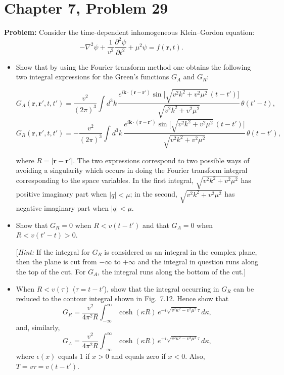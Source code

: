 \documentclass[12pt]{article}
\begin{document}
\section*{Chapter 7, Problem 29}

\textbf{Problem:} Consider the time-dependent inhomogeneous Klein--Gordon equation:
\[
-\nabla^2\psi + \frac{1}{v^2}\frac{\partial^2\psi}{\partial t^2} + \mu^2\psi = f(\mathbf{r},t).
\]

\begin{itemize}
\item[a)] Show that by using the Fourier transform method one obtains the following two integral expressions for the Green's functions $G_A$ and $G_R$:

\[
G_A(\mathbf{r},\mathbf{r}',t,t') = \frac{v^2}{(2\pi)^3}\int d^3k\,\frac{e^{i\mathbf{k}\cdot(\mathbf{r}-\mathbf{r}')}\sin\bigl[\sqrt{v^2 k^2+v^2\mu^2}\,(t-t')\bigr]}{\sqrt{v^2k^2+v^2\mu^2}}\,\theta(t'-t),
\]
\[
G_R(\mathbf{r},\mathbf{r}',t,t') = -\frac{v^2}{(2\pi)^3}\int d^3k\,\frac{e^{i\mathbf{k}\cdot(\mathbf{r}-\mathbf{r}')}\sin\bigl[\sqrt{v^2 k^2+v^2\mu^2}\,(t-t')\bigr]}{\sqrt{v^2k^2+v^2\mu^2}}\,\theta(t-t'),
\]

where $R = |\mathbf{r}-\mathbf{r}'|$. The two expressions correspond to two possible ways of avoiding a singularity which occurs in doing the Fourier transform integral corresponding to the space variables. In the first integral, $\sqrt{v^2k^2+v^2\mu^2}$ has positive imaginary part when $|q| < \mu$; in the second, $\sqrt{v^2k^2+v^2\mu^2}$ has negative imaginary part when $|q| < \mu$.

\item[b)] Show that $G_R = 0$ when $R < v(t-t')$ and that $G_A = 0$ when $R < v(t'-t) > 0$.

[\textit{Hint:} If the integral for $G_R$ is considered as an integral in the complex plane, then the plane is cut from $-\infty$ to $+\infty$ and the integral in question runs along the top of the cut. For $G_A$, the integral runs along the bottom of the cut.]

\item[c)] When $R < v(\tau)$ ($\tau = t-t'$), show that the integral occurring in $G_R$ can be reduced to the contour integral shown in Fig.\ 7.12. Hence show that
\[
G_R = \frac{v^2}{4\pi^2 R}\int_{-\infty}^{\infty}\cosh(\kappa R)\,e^{-i\sqrt{v^2\kappa^2-v^2\mu^2}\,\tau}\,d\kappa,
\]
and, similarly,
\[
G_A = \frac{v^2}{4\pi^2 R}\int_{-\infty}^{\infty}\cosh(\kappa R)\,e^{+i\sqrt{v^2\kappa^2-v^2\mu^2}\,\tau}\,d\kappa,
\]
where $\epsilon(x)$ equals 1 if $x > 0$ and equals zero if $x < 0$. Also, $T = v\tau = v(t-t')$.


\end{itemize}
\end{document}
